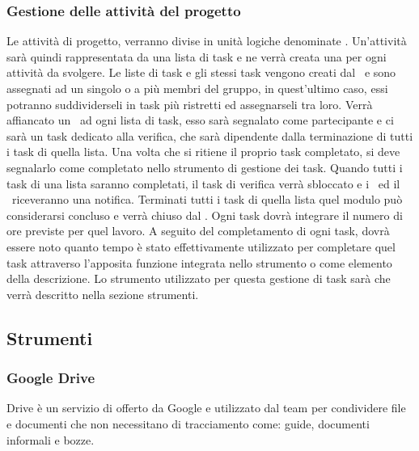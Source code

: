 \documentclass[../NormeDiProgetto.tex]{subfiles}
\begin{document}
\subsubsection{Gestione delle attività del progetto}
Le attività di progetto, verranno divise in unità logiche denominate . Un'attività sarà quindi rappresentata da una lista di task e ne verrà creata una per ogni attività da svolgere.
Le liste di task e gli stessi task vengono creati dal \responsabilediprogetto\ e sono assegnati ad un singolo o a più membri del gruppo, in quest'ultimo caso, essi potranno suddividerseli in task più ristretti ed assegnarseli tra loro.
Verrà affiancato un \verificatore\ ad ogni lista di task, esso sarà segnalato come partecipante e ci sarà un task dedicato alla verifica, che sarà dipendente dalla terminazione di tutti i task di quella lista.
Una volta che si ritiene il proprio task completato, si deve segnalarlo come completato nello strumento di gestione dei task.
Quando tutti i task di una lista saranno completati, il task di verifica verrà sbloccato e i \verificatori\ ed il \responsabilediprogetto\ riceveranno una notifica.
Terminati tutti i task di quella lista quel modulo può considerarsi concluso e verrà chiuso dal \responsabilediprogetto.
Ogni task dovrà integrare il numero di ore previste per quel lavoro.
A seguito del completamento di ogni task, dovrà essere noto quanto tempo è stato effettivamente utilizzato per completare quel task attraverso l'apposita funzione integrata nello strumento o come elemento della descrizione.
Lo strumento utilizzato per questa gestione di task sarà  che verrà descritto nella sezione strumenti.
\subsection{Strumenti}

\subsubsection{Google Drive}
Drive è un servizio di  offerto da Google e utilizzato dal team per condividere file e documenti che non necessitano di tracciamento come: guide, documenti informali e bozze.
\end{document}
